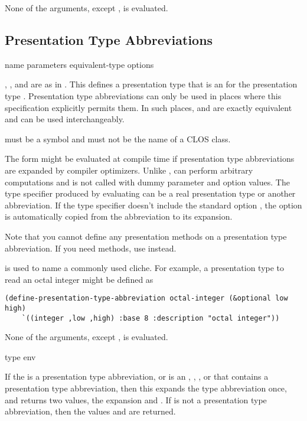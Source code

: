 None of the arguments, except , is evaluated.


\subsection {Presentation Type Abbreviations}

 {name parameters equivalent-type 
                                                   \key options}

, , and  are as in
.  This defines a presentation type that is an
 for the presentation type .
Presentation type abbreviations can only be used in places where this
specification explicitly permits them.  In such places, 
and  are exactly equivalent and can be used interchangeably.

 must be a symbol and must not be the name of a CLOS class.

The  form might be evaluated at compile time if
presentation type abbreviations are expanded by compiler optimizers.  Unlike
,  can perform arbitrary computations and
is not called with dummy parameter and option values.  The type specifier
produced by evaluating  can be a real presentation type or
another abbreviation.  If the type specifier doesn't include the standard option
, the option is automatically copied from the abbreviation to
its expansion.

Note that you cannot define any presentation methods on a presentation type
abbreviation.  If you need methods, use  instead.

 is used to name a commonly used
cliche.  For example, a presentation type to read an octal integer might be
defined as
\begin{verbatim}
(define-presentation-type-abbreviation octal-integer (&optional low high) 
    `((integer ,low ,high) :base 8 :description "octal integer"))
\end{verbatim}

None of the arguments, except , is evaluated.


 {type \optional env}

If the   is a presentation type
abbreviation, or is an , , , or
 that contains a presentation type abbreviation, then
this expands the type abbreviation once, and returns two values, the expansion
and .  If  is not a presentation type abbreviation, then the
values  and  are returned.

